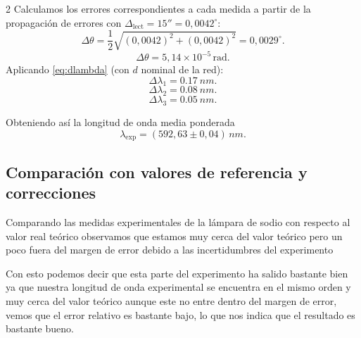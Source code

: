 \documentclass[12pt,a4paper]{article}
\begin{document}
\begin{multicols}{2}
Calculamos los errores correspondientes a cada medida a partir de la propagación de errores con $\Delta_\mathrm{lect}=15''=0{,}0042^\circ$:
\[
\Delta\theta=
\frac{1}{2}\sqrt{(0{,}0042)^2+(0{,}0042)^2}
=0{,}0029^\circ.
\]
\[
\Delta\theta=5{,}14\times10^{-5}\,\text{rad}.
\]
Aplicando \eqref{eq:dlambda} (con $d$ nominal de la red):
\begin{equation}
    \Delta\lambda_1=\SI{0.17}{nm}.
\end{equation}
\begin{equation}
    \Delta\lambda_2=\SI{0.08}{nm}.
\end{equation}
\begin{equation}
    \Delta\lambda_3=\SI{0.05}{nm}.
\end{equation}

Obteniendo así la longitud de onda media ponderada
\[
\lambda_{\mathrm{exp}}=(592{,}63\pm0{,}04)\,\si{nm}.
\]

\subsection{Comparación con valores de referencia y correcciones}

Comparando las medidas experimentales de la lámpara de sodio con respecto al valor real teórico observamos que estamos muy cerca del valor teórico pero un poco fuera del margen de error debido a las incertidumbres del experimento 

\begin{table}[H]
\centering
\caption{Comparación final con valores de referencia.}
\label{tab:comparacion}
\vspace{0.3cm}
\footnotesize
{}
\end{table}

Con esto podemos decir que esta parte del experimento ha salido bastante bien ya que nuestra longitud de onda experimental se encuentra en el mismo orden y muy cerca del valor teórico aunque este no entre dentro del margen de error, vemos que el error relativo es bastante bajo, lo que nos indica que el resultado es bastante bueno.


\end{multicols}
\end{document}

